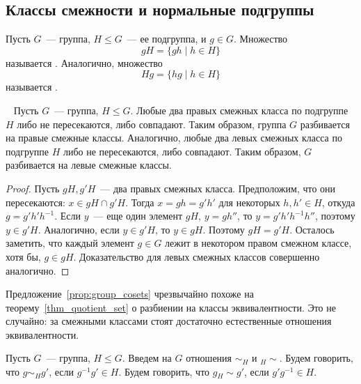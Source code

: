 \subsection{Классы смежности и нормальные подгруппы}


\begin{definition}
Пусть $G$~--- группа, $H\leq G$~--- ее подгруппа, и $g\in
G$. Множество
$$
gH = \{gh\mid h\in H\}
$$
называется .
Аналогично, множество
$$
Hg = \{hg\mid h\in H\}
$$
называется .
\end{definition}

\begin{proposition}~\label{prop:group_cosets}
Пусть $G$~--- группа, $H\leq G$.
Любые два правых смежных класса по подгруппе $H$ либо не пересекаются,
либо совпадают. Таким образом, группа $G$ разбивается на правые
смежные классы.
Аналогично, любые два левых смежных класса по подгруппе $H$ либо не
пересекаются, либо совпадают. Таким образом, $G$ разбивается на левые
смежные классы.
\end{proposition}
\begin{proof}
Пусть $gH, g'H$~--- два правых смежных класса. Предположим, что они
пересекаются: $x\in gH\cap g'H$. Тогда $x = gh = g'h'$ для некоторых
$h,h'\in H$, откуда $g = g'h'h^{-1}$. Если $y$~--- еще один элемент
$gH$, $y=gh''$, то $y = g'h'h^{-1}h''$, поэтому $y\in
g'H$. Аналогично, если $y\in g'H$, то $y\in gH$. Поэтому $gH =
g'H$. Осталось заметить, что каждый элемент $g\in G$ лежит в некотором
правом смежном классе, хотя бы, $g\in gH$.
Доказательство для левых смежных классов совершенно аналогично.
\end{proof}

Предложение~\ref{prop:group_cosets} чрезвычайно похоже на
теорему~\ref{thm_quotient_set} о разбиении на классы эквивалентности.
Это не случайно: за смежными классами стоят достаточно естественные
отношения эквивалентности.

\begin{definition}
Пусть $G$~--- группа, $H\leq G$. Введем на $G$ отношения $\sim_H$ и
${}_H{\sim}$. Будем говорить, что
$g\sim_Hg'$, если $g^{-1}g'\in H$.
Будем говорить, что $g{}_H{\sim} g'$, если $g'g^{-1}\in H$.
\end{definition}

